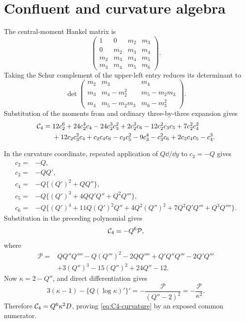 \section{Confluent and curvature algebra}\label{app:algebra}

The central-moment Hankel matrix is
\[
 \begin{pmatrix}
 1&0&m_2&m_3\\
 0&m_2&m_3&m_4\\
 m_2&m_3&m_4&m_5\\
 m_3&m_4&m_5&m_6
 \end{pmatrix}.
\]
Taking the Schur complement of the upper-left entry reduces its determinant to
\[
 \det\begin{pmatrix}
 m_2&m_3&m_4\\
 m_3&m_4-m_2^2&m_5-m_2m_3\\
 m_4&m_5-m_2m_3&m_6-m_3^2
 \end{pmatrix}.
\]
Substitution of the moments from  and ordinary
three-by-three expansion gives
\begin{align*}
\mathcal{C}_4={}&12c_2^6+24c_2^4c_4-24c_2^3c_3^2+2c_2^3c_6
-12c_2^2c_3c_5+7c_2^2c_4^2\\
&+12c_2c_3^2c_4+c_2c_4c_6-c_2c_5^2-9c_3^4-c_3^2c_6
+2c_3c_4c_5-c_4^3.
\end{align*}

In the curvature coordinate, repeated application of
\(Q\dd/\dd y\) to \(c_2=-Q\) gives
\begin{align*}
c_2={}&-Q,\\
c_3={}&-QQ',\\
c_4={}&-Q\{(Q')^2+QQ''\},\\
c_5={}&-Q\{(Q')^3+4QQ'Q''+Q^2Q'''\},\\
c_6={}&-Q\{(Q')^4+11Q(Q')^2Q''+4Q^2(Q'')^2
 +7Q^2Q'Q'''+Q^3Q''''\}.
\end{align*}
Substitution in the preceding polynomial gives
\[
 \mathcal{C}_4=-Q^6\mathcal P,
\]
where
\begin{align*}
\mathcal P={}&QQ''Q''''-Q(Q''')^2-2QQ''''+Q'Q''Q'''-2Q'Q'''\\
&+3(Q'')^3-15(Q'')^2+24Q''-12.
\end{align*}
Now \(\kappa=2-Q''\), and direct differentiation gives
\[
 3(\kappa-1)-\{Q(\log\kappa)'\}'
 =-\frac{\mathcal P}{(Q''-2)^2}
 =-\frac{\mathcal P}{\kappa^2}.
\]
Therefore \(\mathcal{C}_4=Q^6\kappa^2D\), proving
\eqref{eq:C4-curvature} by an exposed common numerator.


